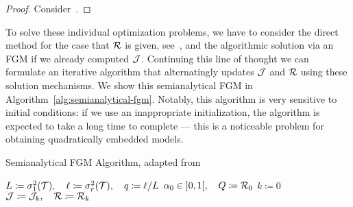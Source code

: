 \begin{proof}
    Consider~\cite[Lemma~2.1]{Deng2003}.
\end{proof}

To solve these individual optimization problems, we have to consider the direct method for the case that $\mathcal{R}$ is given, see~\cite[Theorem~3.4]{Morandin2023}, and the algorithmic solution via an \ac{FGM} if we already computed $\mathcal{J}$.
Continuing this line of thought we can formulate an iterative algorithm that alternatingly updates $\mathcal{J}$ and $\mathcal{R}$ using these solution mechanisms.
We show this semianalytical \ac{FGM} in Algorithm~\ref{alg:semianalytical-fgm}.
Notably, this algorithm is very sensitive to initial conditions: if we use an inappropriate initialization, the algorithm is expected to take a long time to complete --- this is a noticeable problem for obtaining quadratically embedded models.

\begin{algorithm}\label{alg:semianalytical-fgm}
    \caption{Semianalytical \ac{FGM} Algorithm, adapted from~\cite[Algorithm~1]{Morandin2023}}
    $L \coloneqq \sigma_1^2(\mathcal{T}),\quad \ell \coloneqq \sigma_r^2(\mathcal{T}),\quad q \coloneqq \ell / L$\;
    $\alpha_0 \in \interval[open]{0}{1},\quad Q \coloneqq \mcl{R}_0$\;
    $k \coloneqq 0$\;
    $\mathcal{J} \coloneqq \mathcal{J}_k,\quad \mathcal{R} \coloneqq \mathcal{R}_k$\;
\end{algorithm}


